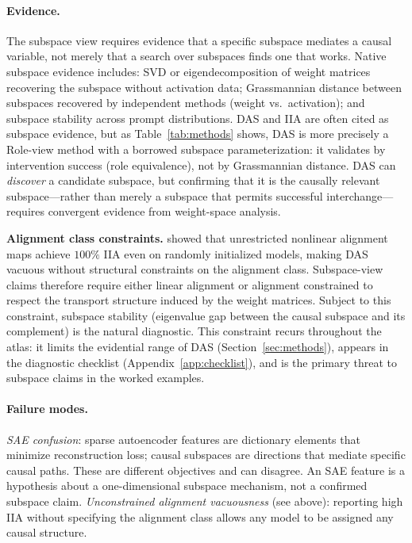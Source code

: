 \documentclass{article}
\begin{document}
\paragraph{Evidence.}
The subspace view requires evidence that a specific subspace mediates a
causal variable, not merely that a search over subspaces finds one that
works.  Native subspace evidence includes: SVD or eigendecomposition of
weight matrices recovering the subspace without activation data;
Grassmannian distance between subspaces recovered by independent methods
(weight vs.\ activation); and subspace stability across prompt
distributions.  DAS and IIA are often cited as subspace evidence, but as
Table~\ref{tab:methods} shows, DAS is more precisely a Role-view method
with a borrowed subspace parameterization: it validates by intervention
success (role equivalence), not by Grassmannian distance.  DAS can
\emph{discover} a candidate subspace, but confirming that it is the
causally relevant subspace---rather than merely a subspace that permits
successful interchange---requires convergent evidence from weight-space
analysis.

\textbf{Alignment class constraints.}  \citet{sutter2025}\label{sutter}
showed that unrestricted nonlinear alignment maps achieve $100\%$ IIA
even on randomly initialized models, making DAS vacuous without
structural constraints on the alignment class.  Subspace-view claims
therefore require either linear alignment or alignment constrained to
respect the transport structure induced by the weight matrices.  Subject
to this constraint, subspace stability (eigenvalue gap between the causal
subspace and its complement) is the natural diagnostic.  This constraint
recurs throughout the atlas: it limits the evidential range of DAS
(Section~\ref{sec:methods}), appears in the diagnostic checklist
(Appendix~\ref{app:checklist}), and is the primary threat to subspace
claims in the worked examples.

\paragraph{Failure modes.}
\emph{SAE confusion}: sparse autoencoder features are dictionary elements
that minimize reconstruction loss; causal subspaces are directions that
mediate specific causal paths.  These are different objectives and can
disagree.  An SAE feature is a hypothesis about a one-dimensional
subspace mechanism, not a confirmed subspace claim.  \emph{Unconstrained alignment vacuousness} (see above):
reporting high IIA without specifying the alignment class allows any
model to be assigned any causal structure.
\end{document}
